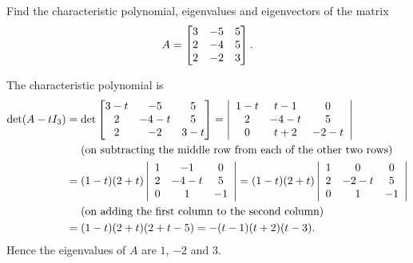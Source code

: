 \documentclass[a4paper]{amsart}
\renewenvironment{solution}{\SolutionInline}{\endSolutionInline}
\begin{document}
\begin{exercise}\label{ex-evectrs-iv}
 Find the characteristic polynomial, eigenvalues and eigenvectors of
 the matrix 
 \[ A = \left[\begin{matrix} 
          3 & -5 & 5 \\
          2 & -4 & 5 \\
          2 & -2 & 3
         \end{matrix}\right].
 \]
\end{exercise}
\begin{solution}
 The characteristic polynomial is
     \begin{align*} \det (A - tI_3) &=
     \det \left[\begin{matrix}
     3-t & -5 & 5 \\
     2 & -4-t & 5 \\
     2 & -2 & 3-t
     \end{matrix}\right]= \left|\begin{array}{ccc}
 1-t & t-1 & 0 \\
     2 & -4-t & 5 \\
     0 & t+2 & -2-t
     \end{array}\right|\\& \quad \text{~(on subtracting the middle
     row from each of the other two rows)}\\ &
     = (1-t)(2+t)\left|\begin{array}{ccc}
 1 & -1 & 0 \\
     2 & -4-t & 5 \\
     0 & 1 & -1
     \end{array}\right| = (1-t)(2+t)\left|\begin{array}{ccc}
 1 & 0 & 0 \\
     2 & -2-t & 5 \\
     0 & 1 & -1
     \end{array}\right|\\& \quad \text{~(on adding the first column
     to the second column)}\\ &
     =(1-t)(2+t)(2+t-5) = -(t-1)(t+2)(t-3).
     \end{align*}
  Hence the eigenvalues of $A$
 are $1$, $-2$ and $3$.


\end{solution}
\end{document}
